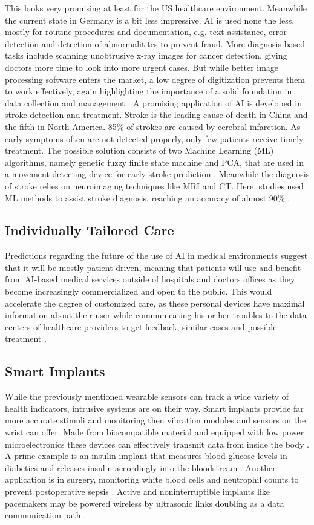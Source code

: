 This looks very promising at least for the US healthcare environment. Meanwhile the current state in Germany is a bit less impressive. AI is used none the less, mostly for routine procedures and documentation, e.g. text assistance, error detection and detection of abnormalitites to prevent fraud. More diagnosis-based tasks include scanning unobtrusive x-ray images for cancer detection, giving doctors more time to look into more urgent cases. But while better image processing software enters the market, a low degree of digitization prevents them to work effectively, again highlighting the importance of a solid foundation in data collection and management \cite{kiKroenung}. A promising application of AI is developed in stroke detection and treatment. Stroke is the leading cause of death in China and the fifth in North America. 85\% of strokes are caused by cerebral infarction. As early symptoms often are not detected properly, only few patients receive timely treatment. The possible solution consists of two Machine Learning (ML) algorithms, namely genetic fuzzy finite state machine and PCA, that are used in a movement-detecting device for early stroke prediction \cite{villar2015improving}. Meanwhile the diagnosis of stroke relies on neuroimaging techniques like MRI and CT. Here, studies used ML methods to assist stroke diagnosis, reaching an accuracy of almost 90\% \cite{rehme2014identifying}.
\subsection{Individually Tailored Care}
Predictions regarding the future of the use of AI in medical environments suggest that it will be mostly patient-driven, meaning that patients will use and benefit from AI-based medical services outside of hospitals and doctors offices as they become increasingly commercialized and open to the public. This would accelerate the degree of customized care, as these personal devices have maximal information about their user while communicating his or her troubles to the data centers of healthcare providers to get feedback, similar cases and possible treatment \cite{kiKroenung}.
\subsection{Smart Implants}
While the previously mentioned wearable sensors can track a wide variety of health indicators, intrusive systems are on their way. Smart implants provide far more accurate stimuli and monitoring then vibration modules and sensors on the wrist can offer. Made from biocompatible material and equipped with low power microelectronics these devices can effectively transmit data from inside the body \cite{andreu2015wearable}. A prime example is an insulin implant that measures blood glucose levels in diabetics and releases insulin accordingly into the bloodstream \cite{rege2017development}. Another application is in surgery, monitoring white blood cells and neutrophil counts to prevent postoperative sepsis \cite{venema2013robustness}. Active and noninterruptible implants like pacemakers may be powered wireless by ultrasonic links doubling as a data communication path \cite{ozeri2010ultrasonic}.
